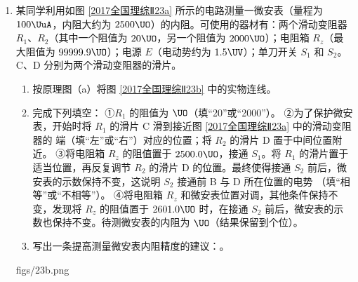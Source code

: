 \documentclass[\gkver]{gaokaozhenti}
\begin{document}
\begin{enumerate}
\item
某同学利用如图 \ref{2017全国理综Ⅱ23a} 所示的电路测量一微安表（量程为 $100 \UuA$，内阻大约为 $2500 \UO$）的内阻。可使用的器材有：两个滑动变阻器 $R_1$、$R_2$（其中一个阻值为 $20 \UO$，另一个阻值为 $2000 \UO$）；电阻箱 $R_z$（最大阻值为 $99999.9 \UO$）；电源 $E$（电动势约为 $1.5 \UV$）；单刀开关 $S_1$ 和 $S_2$。C、D 分别为两个滑动变阻器的滑片。
\begin{enumerate}
	\item
	按原理图（a）将图 \ref{2017全国理综Ⅱ23b} 中的实物连线。
	\item
	完成下列填空：
	①$R_1$ 的阻值为 \tkanswer[1.5cm]{} $\UO$（填“20”或“2000”）。
	②为了保护微安表，开始时将 $R_1$ 的滑片 C 滑到接近图 \ref{2017全国理综Ⅱ23a} 中的滑动变阻器的 \tkanswer[1.5cm]{} 端（填“左”或“右”）对应的位置；将 $R_2$ 的滑片 D 置于中间位置附近。
	③将电阻箱 $R_z$ 的阻值置于 $2500.0 \UO$，接通 $S_1$。将 $R_1$ 的滑片置于适当位置，再反复调节 $R_2$ 的滑片 D 的位置。最终使得接通 $S_2$ 前后，微安表的示数保持不变，这说明 $S_2$ 接通前 B 与 D 所在位置的电势 \tkanswer[1.5cm]{}（填“相等”或“不相等”）。
	④将电阻箱 $R_z$ 和微安表位置对调，其他条件保持不变，发现将 $R_z$ 的阻值置于 $2601.0 \UO$ 时，在接通 $S_2$ 前后，微安表的示数也保持不变。待测微安表的内阻为 \tkanswer[1.5cm]{} $\UO$（结果保留到个位）。
	\item
	写出一条提高测量微安表内阻精度的建议：\tkanswer[2cm]{}。
\end{enumerate}
{figs/23b.png}
\end{enumerate}
\end{document}
